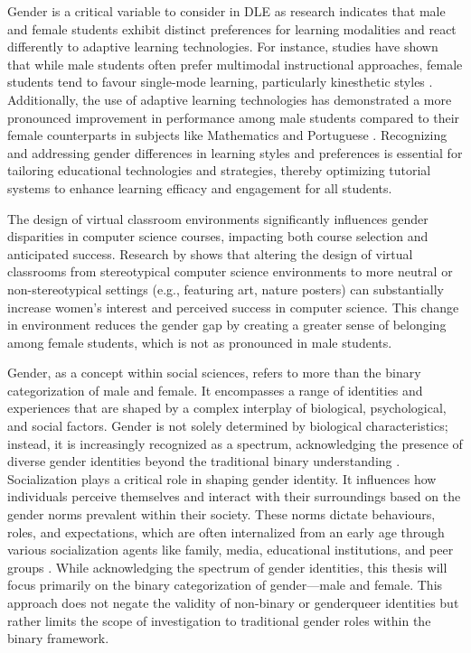 Gender is a critical variable to consider in DLE as research indicates that male and female students exhibit distinct preferences for learning modalities and react differently to adaptive learning technologies.
For instance, studies have shown that while male students often prefer multimodal instructional approaches, female students tend to favour single-mode learning, particularly kinesthetic styles \parencite{wehrweinGenderDifferencesLearning2007}.
Additionally, the use of adaptive learning technologies has demonstrated a more pronounced improvement in performance among male students compared to their female counterparts in subjects like Mathematics and Portuguese \parencite{desantanaEvaluatingImpactMars2016}.
Recognizing and addressing gender differences in learning styles and preferences is essential for tailoring educational technologies and strategies, thereby optimizing tutorial systems to enhance learning efficacy and engagement for all students.

The design of virtual classroom environments significantly influences gender disparities in computer science courses, impacting both course selection and anticipated success.
Research by \textcite{cheryanClassroomsMatterDesign2011} shows that altering the design of virtual classrooms from stereotypical computer science environments  to more neutral or non-stereotypical settings (e.g., featuring art, nature posters) can substantially increase women's interest and perceived success in computer science.
This change in environment reduces the gender gap by creating a greater sense of belonging among female students, which is not as pronounced in male students.

Gender, as a concept within social sciences, refers to more than the binary categorization of male and female.
It encompasses a range of identities and experiences that are shaped by a complex interplay of biological, psychological, and social factors.
Gender is not solely determined by biological characteristics; instead, it is increasingly recognized as a spectrum, acknowledging the presence of diverse gender identities beyond the traditional binary understanding \parencite{lindqvistWhatGenderAnyway2021}.
Socialization plays a critical role in shaping gender identity. It influences how individuals perceive themselves and interact with their surroundings based on the gender norms prevalent within their society.
These norms dictate behaviours, roles, and expectations, which are often internalized from an early age through various socialization agents like family, media, educational institutions, and peer groups \parencite{kampshoffHandbuchGeschlechterforschungUnd2012}.
While acknowledging the spectrum of gender identities, this thesis will focus primarily on the binary categorization of gender—male and female.
This approach does not negate the validity of non-binary or genderqueer identities but rather limits the scope of investigation to traditional gender roles within the binary framework.



